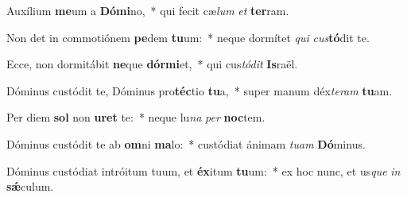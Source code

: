 \item Auxílium \textbf{me}um a \textbf{Dó}\textbf{mi}no,~* qui fecit cæ\textit{lum} \textit{et} \textbf{ter}ram.
\item Non det in commotiónem \textbf{pe}dem \textbf{tu}um:~* neque dormítet \textit{qui} \textit{cus}\textbf{tó}dit te.
\item Ecce, non dormitábit \textbf{ne}que \textbf{dór}\textbf{mi}et,~* qui cus\textit{tó}\textit{dit} \textbf{Is}raël.
\item Dóminus custódit te, Dóminus pro\textbf{téc}tio \textbf{tu}a,~* super manum déx\textit{te}\textit{ram} \textbf{tu}am.
\item Per diem \textbf{sol} non \textbf{u}\textbf{ret} te:~* neque lu\textit{na} \textit{per} \textbf{noc}tem.
\item Dóminus custódit te ab \textbf{om}ni \textbf{ma}lo:~* custódiat ánimam \textit{tu}\textit{am} \textbf{Dó}minus.
\item Dóminus custódiat intróitum tuum, et \textbf{éx}itum \textbf{tu}um:~* ex hoc nunc, et us\textit{que} \textit{in} \textbf{sǽ}culum.
